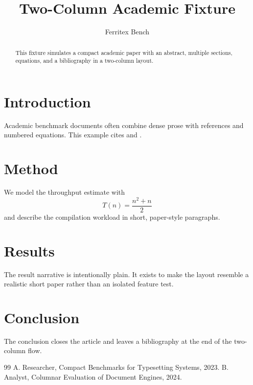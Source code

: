 \documentclass[twocolumn]{article}
\title{Two-Column Academic Fixture}
\author{Ferritex Bench}
\begin{document}
\maketitle

\begin{abstract}
This fixture simulates a compact academic paper with an abstract, multiple sections, equations, and a bibliography in a two-column layout.
\end{abstract}

\section{Introduction}
Academic benchmark documents often combine dense prose with references and numbered equations. This example cites \cite{paperA} and \cite{paperB}.

\section{Method}
We model the throughput estimate with
\begin{equation}
T(n) = \frac{n^2 + n}{2}
\end{equation}
and describe the compilation workload in short, paper-style paragraphs.

\section{Results}
The result narrative is intentionally plain. It exists to make the layout resemble a realistic short paper rather than an isolated feature test.

\section{Conclusion}
The conclusion closes the article and leaves a bibliography at the end of the two-column flow.

\begin{thebibliography}{99}
 A. Researcher, Compact Benchmarks for Typesetting Systems, 2023.
 B. Analyst, Columnar Evaluation of Document Engines, 2024.
\end{thebibliography}
\end{document}
